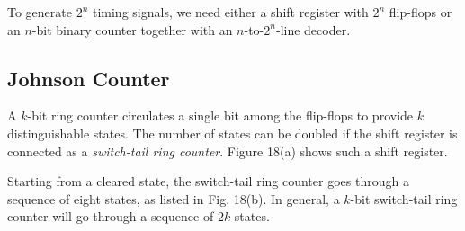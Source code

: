 To generate $2^n$ timing signals, we need either a shift register with $2^n$ flip-flops or an $n$-bit binary counter together with an $n$-to-$2^n$-line decoder.

\subsection{Johnson Counter}
\label{subsec:johnson-counter}

A $k$-bit ring counter circulates a single bit among the flip-flops to provide $k$ distinguishable states. The number of states can be doubled if the shift register is connected as a \textit{switch-tail ring counter}. Figure 18(a) shows such a shift register.

Starting from a cleared state, the switch-tail ring counter goes through a sequence of eight states, as listed in Fig. 18(b). In general, a $k$-bit switch-tail ring counter will go through a sequence of $2k$ states.

\vspace*{\fill}
\columnbreak

\setcounter{figure}{16}

